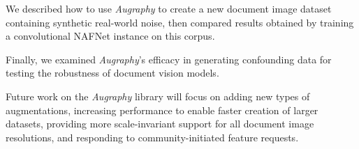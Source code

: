 \documentclass[runningheads]{llncs}
\begin{document}
We described how to use \emph{Augraphy} to create a new document image dataset containing synthetic real-world noise, then compared results obtained by training a convolutional NAFNet instance on this corpus.

Finally, we examined \emph{Augraphy}'s efficacy in generating confounding data for testing the robustness of document vision models.

Future work on the \emph{Augraphy} library will focus on adding new types of augmentations, increasing performance to enable faster creation of larger datasets, providing more scale-invariant support for all document image resolutions, and responding to community-initiated feature requests.

%
%
%


\end{document}
